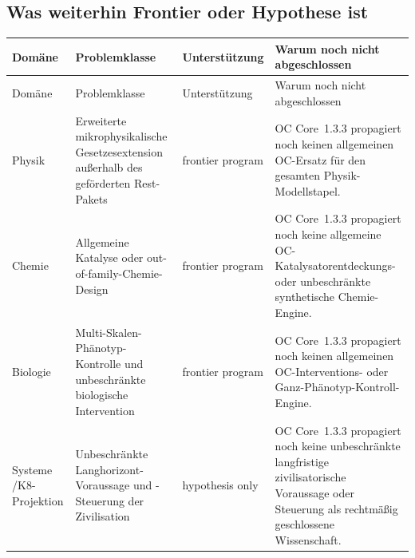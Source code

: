 \subsection{Was weiterhin Frontier oder Hypothese ist}
\begingroup
\scriptsize
\setlength{\emergencystretch}{1.5em}
\setlength{\tabcolsep}{2pt}
\setlength{\LTleft}{0pt}
\setlength{\LTright}{0pt}
\begin{longtable}{@{}L{0.11\textwidth}L{0.19\textwidth}L{0.14\textwidth}L{0.48\textwidth}@{}}
\toprule
Domäne & Problemklasse & Unterstützung & Warum noch nicht abgeschlossen \\
\midrule
\endfirsthead
\toprule
Domäne & Problemklasse & Unterstützung & Warum noch nicht abgeschlossen \\
\midrule
\endhead
Physik & Erweiterte mikrophysikalische Gesetzesextension außerhalb des geförderten Rest-Pakets & frontier program & OC Core~1.3.3 propagiert noch keinen allgemeinen OC-Ersatz für den gesamten Physik-Modellstapel. \\
Chemie & Allgemeine Katalyse oder out-of-family-Chemie-Design & frontier program & OC Core~1.3.3 propagiert noch keine allgemeine OC-Katalysatorentdeckungs- oder unbeschränkte synthetische Chemie-Engine. \\
Biologie & Multi-Skalen-Phänotyp-Kontrolle und unbeschränkte biologische Intervention & frontier program & OC Core~1.3.3 propagiert noch keinen allgemeinen OC-Interventions- oder Ganz-Phänotyp-Kontroll-Engine. \\
Systeme /\allowbreak K8-Projektion & Unbeschränkte Langhorizont-Voraussage und -Steuerung der Zivilisation & hypothesis only & OC Core~1.3.3 propagiert noch keine unbeschränkte langfristige zivilisatorische Voraussage oder Steuerung als rechtmäßig geschlossene Wissenschaft. \\
\bottomrule
\end{longtable}
\endgroup
